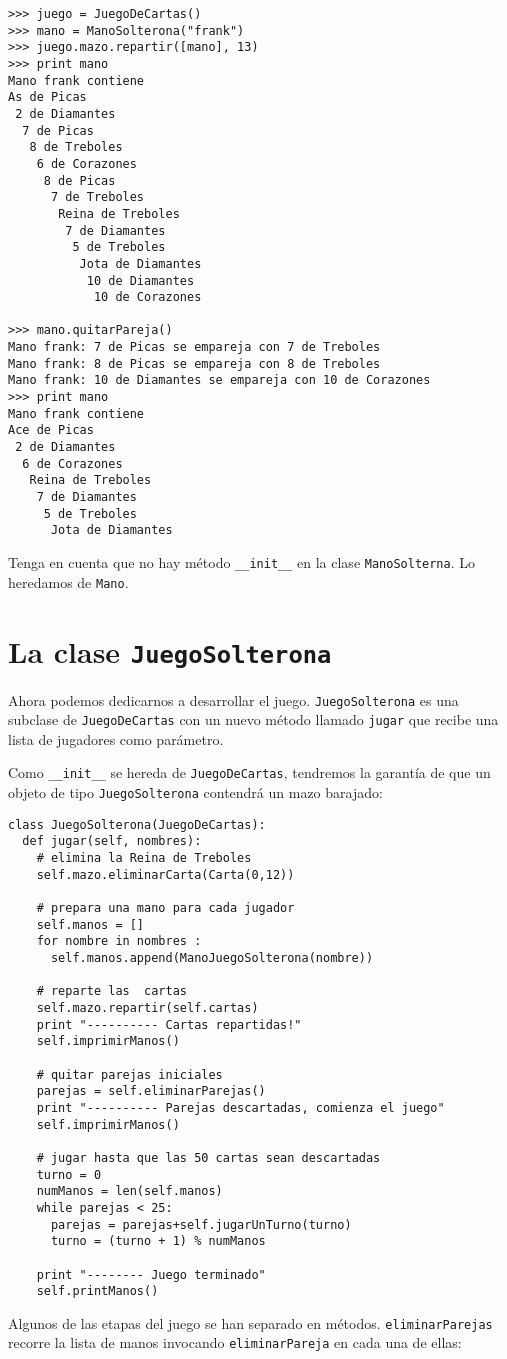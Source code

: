 \beforeverb
\begin{verbatim}
>>> juego = JuegoDeCartas()
>>> mano = ManoSolterona("frank")
>>> juego.mazo.repartir([mano], 13)
>>> print mano
Mano frank contiene
As de Picas
 2 de Diamantes
  7 de Picas
   8 de Treboles
    6 de Corazones
     8 de Picas
      7 de Treboles
       Reina de Treboles
        7 de Diamantes
         5 de Treboles
          Jota de Diamantes
           10 de Diamantes
            10 de Corazones

>>> mano.quitarPareja()
Mano frank: 7 de Picas se empareja con 7 de Treboles
Mano frank: 8 de Picas se empareja con 8 de Treboles
Mano frank: 10 de Diamantes se empareja con 10 de Corazones
>>> print mano
Mano frank contiene
Ace de Picas
 2 de Diamantes
  6 de Corazones
   Reina de Treboles
    7 de Diamantes
     5 de Treboles
      Jota de Diamantes
\end{verbatim}
\afterverb
%
Tenga en cuenta que no hay método  \texttt{\_\_init\_\_} en la clase
\texttt{ManoSolterna}.  Lo heredamos de \texttt{Mano}.


\section {La clase \texttt{JuegoSolterona}}

Ahora podemos dedicarnos a desarrollar el juego.  \texttt{JuegoSolterona} 
es una subclase de \texttt{JuegoDeCartas} con un nuevo método llamado
 \texttt{jugar} que recibe una lista de jugadores como parámetro.

Como  \texttt{\_\_init\_\_} se hereda de \texttt{JuegoDeCartas},
tendremos la garantía de que un objeto de tipo \texttt{JuegoSolterona} 
contendrá un mazo barajado:


\beforeverb
\begin{verbatim}
class JuegoSolterona(JuegoDeCartas):
  def jugar(self, nombres):
    # elimina la Reina de Treboles
    self.mazo.eliminarCarta(Carta(0,12))

    # prepara una mano para cada jugador
    self.manos = []
    for nombre in nombres :
      self.manos.append(ManoJuegoSolterona(nombre))

    # reparte las  cartas
    self.mazo.repartir(self.cartas)
    print "---------- Cartas repartidas!"
    self.imprimirManos()

    # quitar parejas iniciales
    parejas = self.eliminarParejas()
    print "---------- Parejas descartadas, comienza el juego"
    self.imprimirManos()

    # jugar hasta que las 50 cartas sean descartadas
    turno = 0
    numManos = len(self.manos)
    while parejas < 25:
      parejas = parejas+self.jugarUnTurno(turno)
      turno = (turno + 1) % numManos

    print "-------- Juego terminado"
    self.printManos()
\end{verbatim}
\afterverb
%
Algunos de las etapas del juego se han separado en métodos. 
\texttt{eliminarParejas} recorre la lista de manos invocando
 \texttt{eliminarPareja} en cada una de ellas:

